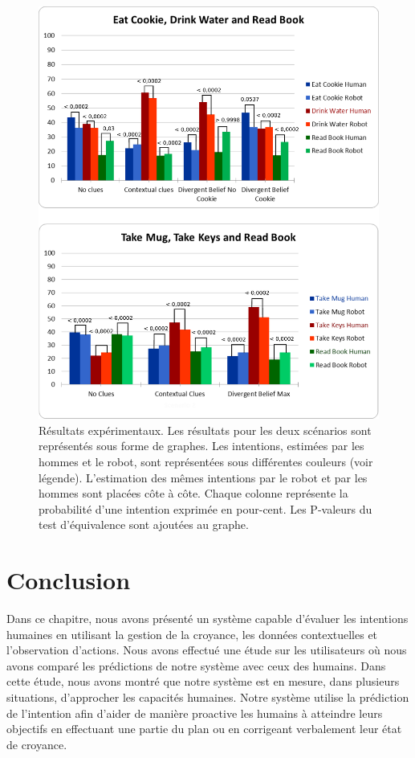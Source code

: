 \documentclass[a4paper,11pt,twoside]{StyleThese}
\begin{document}
 \begin{figure}[h!]
	\centering
	\includegraphics[clip,scale=0.52]{img/pvalues1.pdf}
	\caption{Résultats expérimentaux. Les résultats pour les deux scénarios sont représentés sous forme de graphes. Les intentions, estimées par les hommes et le robot, sont représentées sous différentes couleurs (voir légende). L'estimation des mêmes intentions par le robot et par les hommes sont placées côte à côte. Chaque colonne représente la probabilité d'une intention exprimée en pour-cent. Les P-valeurs du test d'équivalence sont ajoutées au graphe.}
	\label{fig:user_study_results}
  	\vspace{-16pt}
\end{figure}


\section{Conclusion}
Dans ce chapitre, nous avons présenté un système capable d'évaluer les intentions humaines en utilisant la gestion de la croyance, les données contextuelles et l'observation d'actions. Nous avons effectué une étude sur les utilisateurs où nous avons comparé les prédictions de notre système avec ceux des humains. Dans cette étude, nous avons montré que notre système est en mesure, dans plusieurs situations, d'approcher les capacités humaines. Notre système utilise la prédiction de l'intention afin d'aider de manière proactive les humains à atteindre leurs objectifs en effectuant une partie du plan ou en corrigeant verbalement leur état de croyance.
\end{document}
